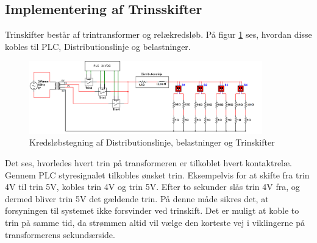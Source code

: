 \subsection{Implementering af Trinsskifter}
\label{sec:ImpTrinskift}
Trinskifter består af trintransformer og relækredsløb. På figur \ref{fig:Trinskift} ses, hvordan disse kobles til PLC, Distributionslinje og belastninger.

\begin{figure}[H]
	\centering
	\includegraphics[width=0.9\textwidth]{figure/Trinskiftertegning2}
	\caption{Kredsløbstegning af Distributionslinje, belastninger og Trinskifter}
	\label{fig:Trinskift}
\end{figure}

Det ses, hvorledes hvert trin på transformeren er tilkoblet hvert kontaktrelæ. Gennem PLC styresignalet tilkobles ønsket trin. Eksempelvis for at skifte fra trin 4V til trin 5V, kobles trin 4V og trin 5V. Efter to sekunder slås trin 4V fra, og dermed bliver trin 5V det gældende trin. På denne måde sikres det, at forsyningen til systemet ikke forsvinder ved trinskift. Det er muligt at koble to trin på samme tid, da strømmen altid vil vælge den korteste vej i viklingerne på transformerens sekundærside. 




